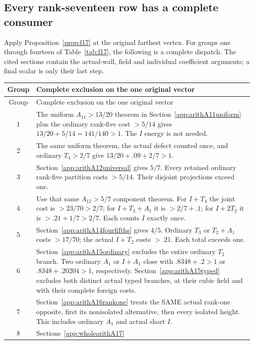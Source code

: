 \documentclass[11pt]{article}
\begin{document}
\subsection{Every rank-seventeen row has a complete consumer}
\label{app:arithrankseventeenclosure}

Apply Proposition~\ref{prop:f17}
at the original farthest vertex.
For groups one through fourteen
of Table~\ref{tab:f17}, the following
is a complete dispatch.
The cited sections contain the
actual-wall, field and individual
coefficient arguments; a final
scalar is only their last step.

\begin{longtable}{cp{10.3cm}}
\toprule Group&Complete exclusion on the one original vector\\\midrule\endfirsthead
\toprule Group&Complete exclusion on the one original vector\\\midrule\endhead
1&The uniform \(A_{11}>13/20\) theorem
in Section~\ref{app:arithA11uniform}
plus the ordinary rank-five cost \(>5/14\)
gives \(13/20+5/14=141/140>1\).
The \(I\) energy is not needed.\\
2&The same uniform theorem, the actual
defect counted once, and ordinary \(T_4>2/7\)
give \(13/20+.09+2/7>1\).\\
3&Section~\ref{app:arithA12universal}
gives \(5/7\). Every retained ordinary
rank-five partition costs \(>5/14\).
Their disjoint projections exceed one.\\
4&Use that same \(A_{12}>5/7\) component
theorem. For \(I+T_4\) the joint cost
is \(>23/70>2/7\); for \(I+T_3+A_1\)
it is \(>2/7+.1\); for \(I+2T_2\)
it is \(>.21+1/7>2/7\).
Each counts \(I\) exactly once.\\
5&Section~\ref{app:arithA14fourfifths}
gives \(4/5\). Ordinary \(T_3\) or
\(T_2+A_1\) costs \(>17/70\);
the actual \(I+T_2\) costs \(>.21\).
Each total exceeds one.\\
6&Section~\ref{app:arithA15ordinary}
excludes the entire ordinary \(T_2\)
branch. Two ordinary \(A_1\) or
\(I+A_1\) close with \(.8348+.2>1\)
or \(.8348+.20204>1\), respectively.
Section~\ref{app:arithA15typed}
excludes both distinct actual typed
branches, at their cubic field and
with their complete foreign costs.\\
7&Section~\ref{app:arithA16rankone}
treats the SAME actual rank-one
opposite, first its nonisolated
alternative, then every isolated
height. This includes ordinary
\(A_1\) and actual short \(I\).\\
8&Sections~\ref{app:wholearithA17}

\end{longtable}
\end{document}
